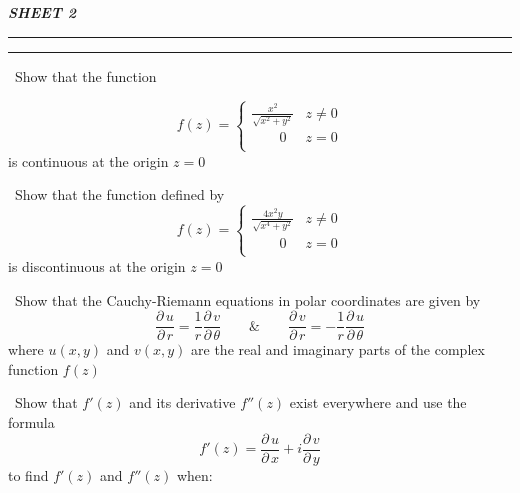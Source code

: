\documentclass[12pt]{exam}
\newcommand{\fz}[0]{\(f(z)\)}
\newcommand{\pupx}{\frac{\partial\, u}{\partial\, x}}
\newcommand{\pvpy}{\frac{\partial\, v}{\partial\, y}}
\newcommand{\pupr}{\frac{\partial\, u}{\partial\, r}}
\newcommand{\pvpr}{\frac{\partial\, v}{\partial\, r}}
\newcommand{\puptheta}{\frac{\partial\, u}{\partial\, \theta}}
\newcommand{\pvptheta}{\frac{\partial\, v}{\partial\, \theta}}
\begin{document}
\begin{center}
    \bfseries\itshape\Huge
    SHEET 2
\end{center}
\hrule\vspace{0.2em}\hrule
\vspace{1em}

\begin{questions}
\large
\question\ Show that the function 

\begin{equation*}
    f(z) = 
    \begin{cases}
         {\displaystyle\frac{x^2}{\sqrt{x^2 + y^2}}} & z \neq 0 \\
         \quad\quad 0 & z = 0 \\
    \end{cases}
\end{equation*}
is continuous at the origin \(z = 0\)

\vspace{1em}

\question\ Show that the function defined by 
\begin{equation*}
    f(z) = 
    \begin{cases}
         {\displaystyle\frac{4x^2 y}{\sqrt{x^4 + y^2}}} & z \neq 0 \\
         \quad\quad 0 & z = 0 \\
    \end{cases}
\end{equation*}
is discontinuous at the origin \(z = 0\)

\vspace{1em}

\question\ Show that the Cauchy-Riemann equations in polar coordinates are given by
\begin{equation*}
    \pupr = \frac{1}{r} \pvptheta \quad\quad \& \quad \quad \pvpr = - \frac{1}{r} \puptheta 
\end{equation*}
where \(u(x,y)\) and \(v(x,y)\) are the real and imaginary parts of the complex function \fz\

\vspace{1em}

\question\ Show that \(f'(z)\) and its derivative \(f''(z)\) exist everywhere and use the formula \[f'(z) = \pupx + i \pvpy\] to find \(f'(z)\) and \(f''(z)\) when:
\end{questions}
\end{document}
